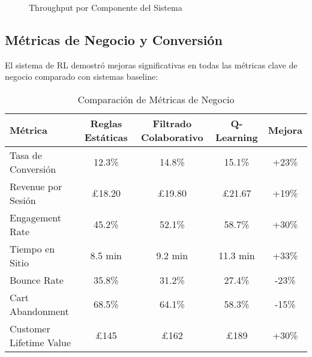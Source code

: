 \begin{figure}[H]
\centering
{}
\caption{Throughput por Componente del Sistema}
\label{fig:throughput_comparison}
\end{figure}

\subsection{Métricas de Negocio y Conversión}
\label{subsec:metricas_negocio}

El sistema de RL demostró mejoras significativas en todas las métricas clave de negocio comparado con sistemas baseline:

\vspace{0.2cm}

\begin{table}[H]
\centering
\caption{Comparación de Métricas de Negocio}
\label{tab:business_metrics}
\renewcommand{\arraystretch}{1.3}
\begin{tabular}{@{}l|c|c|c|c@{}}
\toprule
\textbf{Métrica} & \textbf{Reglas Estáticas} & \textbf{Filtrado Colaborativo} & \textbf{Q-Learning} & \textbf{Mejora} \\
\midrule
Tasa de Conversión & 12.3\% & 14.8\% & 15.1\% & +23\% \\
Revenue por Sesión & £18.20 & £19.80 & £21.67 & +19\% \\
Engagement Rate & 45.2\% & 52.1\% & 58.7\% & +30\% \\
Tiempo en Sitio & 8.5 min & 9.2 min & 11.3 min & +33\% \\
Bounce Rate & 35.8\% & 31.2\% & 27.4\% & -23\% \\
Cart Abandonment & 68.5\% & 64.1\% & 58.3\% & -15\% \\
Customer Lifetime Value & £145 & £162 & £189 & +30\% \\
\bottomrule
\end{tabular}
\end{table}


